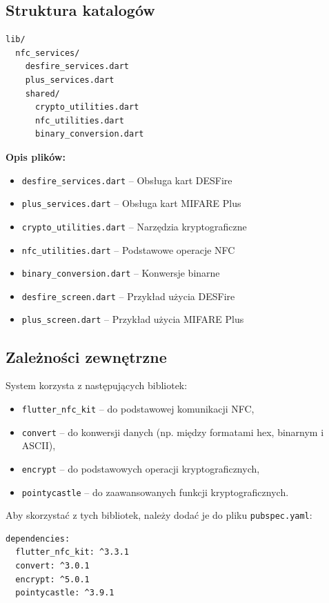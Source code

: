 \documentclass[a4paper,12pt]{article}
\begin{document}
\newpage

\subsection{Struktura katalogów}
\begin{lstlisting}[language=bash]
lib/
  nfc_services/
    desfire_services.dart
    plus_services.dart
    shared/
      crypto_utilities.dart
      nfc_utilities.dart
      binary_conversion.dart
\end{lstlisting}

\textbf{Opis plików:}
\begin{itemize}
    \item \texttt{desfire\_services.dart} -- Obsługa kart DESFire
    \item \texttt{plus\_services.dart} -- Obsługa kart MIFARE Plus
    \item \texttt{crypto\_utilities.dart} -- Narzędzia kryptograficzne
    \item \texttt{nfc\_utilities.dart} -- Podstawowe operacje NFC
    \item \texttt{binary\_conversion.dart} -- Konwersje binarne
    \item \texttt{desfire\_screen.dart} -- Przykład użycia DESFire
    \item \texttt{plus\_screen.dart} -- Przykład użycia MIFARE Plus
\end{itemize}

\subsection{Zależności zewnętrzne}
System korzysta z następujących bibliotek:

\begin{itemize}
    \item \texttt{flutter\_nfc\_kit} – do podstawowej komunikacji NFC,
    \item \texttt{convert} – do konwersji danych (np. między formatami hex, binarnym i ASCII),
    \item \texttt{encrypt} – do podstawowych operacji kryptograficznych,
    \item \texttt{pointycastle} – do zaawansowanych funkcji kryptograficznych.
\end{itemize}

Aby skorzystać z tych bibliotek, należy dodać je do pliku \texttt{pubspec.yaml}:

\begin{lstlisting}[language=bash]
dependencies:
  flutter_nfc_kit: ^3.3.1
  convert: ^3.0.1
  encrypt: ^5.0.1
  pointycastle: ^3.9.1
\end{lstlisting}
\end{document}
